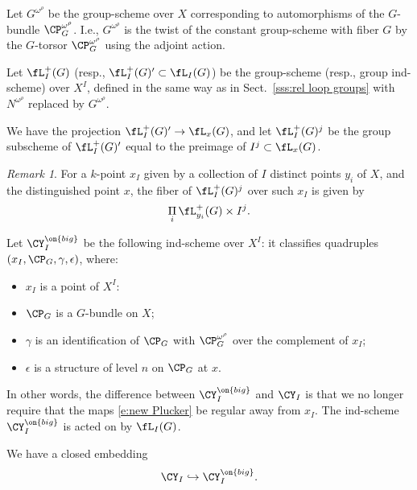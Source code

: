 \documentclass[9pt]{amsart}
\theoremstyle{definition}
\theoremstyle{remark}
\newtheorem{rem}[subsubsection]{Remark}
\newcommand{\secref}[1]{Sect.~\ref{#1}}
\numberwithin{equation}{section}
\begin{document}
\sssec{}

Let $G^{\omega^\rho}$ be the group-scheme over $X$ corresponding to automorphisms of the $G$-bundle $\CP^{\omega^\rho}_G$. 
I.e., $G^{\omega^\rho}$ is the twist of the constant group-scheme with fiber $G$ by the $G$-torsor $\CP^{\omega^\rho}_G$ using 
the adjoint action.

\medskip

Let $\fL^+_I(G)$ (resp., $\fL^+_I(G)'\subset \fL_I(G)$) be the group-scheme (resp., group ind-scheme) over $X^I$,
defined in the same way as in \secref{sss:rel loop groups} with $N^{\omega^\rho}$ replaced by $G^{\omega^\rho}$.

\medskip

We have the projection $\fL^+_I(G)'\to \fL_x(G)$, and let
$\fL^+_I(G)^j$ be the group subscheme of $\fL^+_I(G)'$ equal to the preimage of $I^j\subset \fL_x(G)$.

\begin{rem}
For a $k$-point $x_I$ given by a collection of $I$ distinct points $y_i$ of $X$, and the distinguished point $x$, 
the fiber of $\fL^+_I(G)^j$ over such $x_I$ is given by
$$\underset{i}\Pi\, \fL^+_{y_i}(G)\times I^j.$$
\end{rem}

\sssec{}

Let $\CY_I^{\on{big}}$ be the following ind-scheme over $X^I$: it classifies quadruples $(x_I,\CP_G,\gamma,\epsilon)$, where: 

\begin{itemize}

\item $x_I$ is a point of $X^I$: 

\item $\CP_G$ is a $G$-bundle on $X$; 

\item $\gamma$ is an identification of $\CP_G$ with $\CP_G^{\omega^\rho}$ over the complement of $x_I$; 

\item $\epsilon$ is a structure of level $n$ on $\CP_G$ at $x$.

\end{itemize} 

In other words, the difference between $\CY_I^{\on{big}}$ and $\CY_I$ is that we no longer require that the maps
\eqref{e:new Plucker} be regular away from $x_I$. The ind-scheme $\CY_I^{\on{big}}$ is acted on by $\fL_I(G)$.

\medskip

We have a closed embedding
$$\CY_I\hookrightarrow \CY_I^{\on{big}}.$$ 
\end{document}

